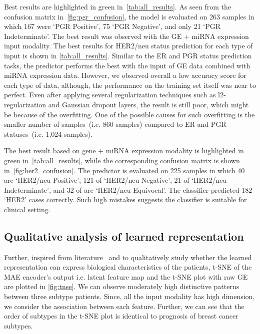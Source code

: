 \hspace*{3.5mm} Best results are highlighted in green in~\cref{tab:all_results}. As seen from the confusion matrix in~\cref{fig:pgr_confusion}, the model is evaluated on 263 samples in which 167 were `PGR Positive', 75 `PGR Negative', and only 21 `PGR Indeterminate'. The best result was observed with the GE + miRNA expression input modality. 
The best results for HER2/neu status prediction for each type of input is shown in \cref{tab:all_results}. Similar to the ER and PGR status prediction tasks, the predictor performs the best with the input of GE data combined with miRNA expression data.  However, we observed overall a low accuracy score for each type of data, although, the performance on the training set itself was near to perfect. Even after applying several regularization techniques such as l2-regularization and Gaussian dropout layers, the result is still poor, which might be because of the overfitting. One of the possible causes for such overfitting is the smaller number of samples~(i.e. 860 samples) compared to ER and PGR statuses~(i.e. 1,024 samples).

\hspace*{3.5mm} The best result based on gene + miRNA expression modality is highlighted in green in~\cref{tab:all_results}, while the corresponding confusion matrix is shown in~\cref{fig:her2_confusion}. The predictor is evaluated on 225 samples in which 40 are `HER2/neu Positive', 121 of `HER2/neu Negative', 21 of `HER2/neu Indeterminate', and 32 of are `HER2/neu Equivocal'. The classifier predicted 182 `HER2' cases correctly. Such high mistakes suggests the classifier is  suitable for clinical setting. %

\subsection{Qualitative analysis of learned representation}
Further, inspired from literature~\cite{rhee2017hybrid} and to qualitatively study whether the learned representation can express biological characteristics of the patients, t-SNE of the MAE encoder's output i.e. latent feature map and the t-SNE plot with raw GE are plotted in \cref{fig:tnse}. We can observe moderately high distinctive patterns between three subtype patients. Since, all the input modality has high dimension, we consider the association between each feature. Further, we can see that the order of subtypes in the t-SNE plot is identical to prognosis of breast cancer subtypes. 

